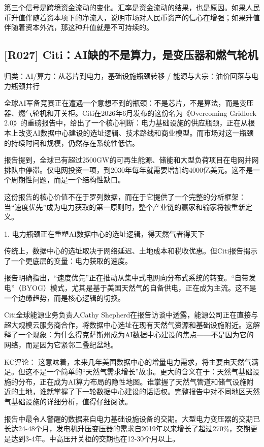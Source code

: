 \documentclass[11pt]{ctexart}
\begin{document}
第三个信号是跨境资金流动的变化。汇率是资金流动的结果，也是原因。如果人民币升值伴随着资本项下的净流入，说明市场对人民币资产的信心在增强；如果升值伴随着资本外流，那这种升值就是不可持续的。

\subsection{[R027] Citi：AI缺的不是算力，是变压器和燃气轮机}
{\small\color{refgray}归类：AI/算力：从芯片到电力，基础设施瓶颈转移 / 能源与大宗：油价回落与电力瓶颈并行}

全球AI军备竞赛正在遭遇一个意想不到的瓶颈：不是芯片，不是算法，而是变压器、燃气轮机和开关柜。Citi在2026年6月发布的这份名为《Overcoming Gridlock 2.0》的重磅报告中，给出了一个核心判断：电力基础设施的供应瓶颈，正在从根本上改变AI数据中心建设的选址逻辑、技术路线和商业模型。而市场对这一瓶颈的持续时间和规模，仍然存在系统性低估。

报告提到，全球已有超过2500GW的可再生能源、储能和大型负荷项目在电网并网排队中停滞。仅电网投资一项，到2030年每年就需要增加约4000亿美元。这不是一个周期性问题，而是一个结构性缺口。

这份报告的核心价值不在于罗列数据，而在于它提供了一个完整的分析框架：当“速度优先”成为电力获取的第一原则时，整个产业链的赢家和输家将被重新定义。

1. 电力瓶颈正在重塑AI数据中心的选址逻辑，得天然气者得天下

传统上，数据中心的选址取决于网络延迟、土地成本和税收优惠。但Citi报告揭示了一个更底层的变量：电力获取的速度。

报告明确指出，“速度优先”正在推动从集中式电网向分布式系统的转变。“自带发电”（BYOG）模式，尤其是基于美国天然气的自备供电，正在成为主流。这不是一个边缘趋势，而是核心逻辑的切换。

Citi全球能源业务负责人Cathy Shepherd在报告访谈中透露，能源公司正在直接与超大规模云服务商合作，将数据中心选址在现有天然气资源和基础设施附近。这解释了一个现象：为什么得克萨斯州成为AI数据中心建设的焦点——不是因为它的网络，而是因为它紧邻二叠纪盆地。

KC评论： 这意味着，未来几年美国数据中心的增量电力需求，将主要由天然气满足。但这不是一个简单的“天然气需求增长”故事。更大的含义在于：天然气基础设施的分布，正在成为AI算力布局的隐性地图。谁掌握了天然气管道和储气设施附近的土地，谁就掌握了下一轮数据中心建设的话语权。完整报告中对不同地区天然气基础设施的详细分析，值得仔细阅读。

报告中最令人警醒的数据来自电力基础设施设备的交期。大型电力变压器的交期已长达24-48个月，发电机升压变压器的需求自2019年以来增长了超过270\%，交期更是达到3-4年。中高压开关柜的交期也在12-30个月以上。
\end{document}
